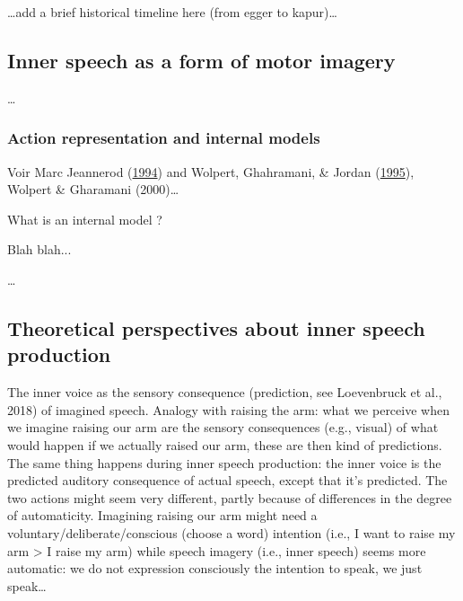 \documentclass[a4paper,12pt,twoside,openright,oldfontcommands]{memoir}
\begin{document}
\ldots{}add a brief historical timeline here (from egger to
kapur)\ldots{}

\subsection{Inner speech as a form of motor
imagery}\label{inner-speech-as-a-form-of-motor-imagery}

\ldots{}

\subsubsection{Action representation and internal
models}\label{action-representation-and-internal-models}

Voir Marc Jeannerod
(\protect\hyperlink{ref-jeannerod_representing_1994}{1994}) and Wolpert,
Ghahramani, \& Jordan
(\protect\hyperlink{ref-wolpert_internal_1995}{1995}), Wolpert \&
Gharamani (2000)\ldots{}

\vspace{2mm}

\begin{mybox}[label = model]{What is an internal model ?}

Blah blah...

\end{mybox}

\ldots{}

\subsection{Theoretical perspectives about inner speech
production}\label{theoretical-perspectives-about-inner-speech-production}

The inner voice as the sensory consequence (prediction, see Loevenbruck
et al., 2018) of imagined speech. Analogy with raising the arm: what we
perceive when we imagine raising our arm are the sensory consequences
(e.g., visual) of what would happen if we actually raised our arm, these
are then kind of predictions. The same thing happens during inner speech
production: the inner voice is the predicted auditory consequence of
actual speech, except that it's predicted. The two actions might seem
very different, partly because of differences in the degree of
automaticity. Imagining raising our arm might need a
voluntary/deliberate/conscious (choose a word) intention (i.e., I want
to raise my arm \textgreater{} I raise my arm) while speech imagery
(i.e., inner speech) seems more automatic: we do not expression
consciously the intention to speak, we just speak\ldots{}
\end{document}
